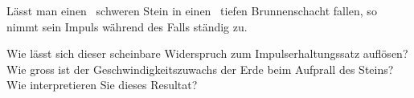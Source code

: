 Lässt man einen \mStO\ schweren Stein in einen \hBrO\ tiefen Brunnenschacht fallen, so nimmt sein Impuls während des Falls ständig zu.

\begin{abcliste}
\abc Wie lässt sich dieser scheinbare Widerspruch zum Impulserhaltungssatz auflösen?
\abc Wie gross ist der Geschwindigkeitszuwachs der Erde beim Aufprall des Steins? Wie interpretieren Sie dieses Resultat?
\end{abcliste}
